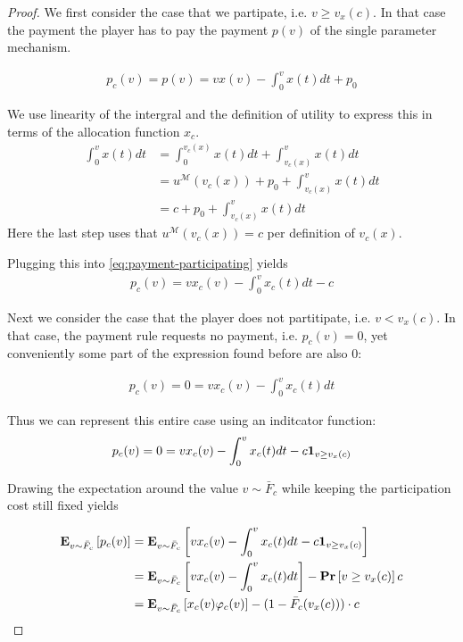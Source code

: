 \documentclass[11pt,a4paper]{article}
\renewcommand{\Pr}[1]{\mbox{\rm\bf Pr}\left[#1\right]}
\newcommand{\Ex}[2][]{\mbox{\rm\bf E}_{#1}\left[#2\right]}
\newcommand{\1}[1]{\mbox{\rm\bf 1}_{#1}}
\begin{document}
\begin{section}{}
\begin{proof}
     We first consider the case that we partipate, i.e. $v \geq v_x(c)$.
     In that case the payment the player has to pay the payment $p(v)$ of the single parameter mechanism.

     \begin{align}
         \label{eq:payment-participating}
         p_c(v) = p(v) = v x(v) - \int_0^v x(t) dt + p_0
     \end{align}

     We use linearity of the intergral and the definition of utility to express this in terms of the allocation function $x_c$.
     \begin{align*}
         \int_0^v x(t) dt & = \int_0^{v_c(x)} x(t) dt + \int_{v_c(x)}^v x(t) dt     \\
                          & = u^\mathcal{M}(v_c(x)) + p_0 + \int_{v_c(x)}^v x(t) dt \\
                          & = c + p_0 + \int_{v_c(x)}^v x(t) dt
     \end{align*}
     Here the last step uses that $u^\mathcal{M}(v_c(x)) = c$ per definition of $v_c(x)$.

     Plugging this into \autoref{eq:payment-participating} yields
     \begin{align*}
         p_c(v) = v x_c(v) - \int_0^v x_c(t) dt - c
     \end{align*}

     Next we consider the case that the player does not partitipate, i.e. $v < v_x(c)$.
     In that case, the payment rule requests no payment, i.e. $p_c(v) = 0$, yet conveniently some part of the expression found before are also $0$:

     \begin{align*}
         p_c(v) = 0 = v x_c(v) - \int_0^v x_c(t) dt
     \end{align*}

     Thus we can represent this entire case using an inditcator function:
     \begin{align*}
         p_c(v) = 0 = v x_c(v) - \int_0^v x_c(t) dt - c \1{v \geq v_x(c)}
     \end{align*}

     Drawing the expectation around the value $v \sim \bar{F}_c$ while keeping the participation cost still fixed yields

     \begin{align*}
         \Ex[v \sim \bar{F}_c]{p_c(v)} & = \Ex[v \sim \bar{F}_c]{v x_c(v) - \int_0^v x_c(t) dt - c \1{v \geq v_x(c)}}   \\
                                       & = \Ex[v \sim \bar{F}_c]{v x_c(v) - \int_0^v x_c(t) dt} - \Pr{v \geq v_x(c)}c   \\
                                       & = \Ex[v \sim \bar{F}_c]{x_c(v) \varphi_c(v)} - (1 - \bar{F}_c(v_x(c))) \cdot c \\
     \end{align*}


\end{proof}
\end{section}
\end{document}
